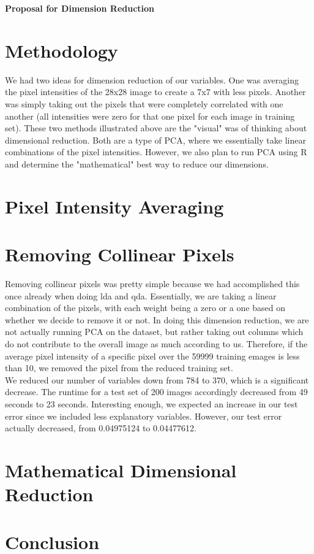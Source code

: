 \documentclass[10pt]{extarticle}
\begin{document}
\noindent
{}

\begin{center}
\LARGE{\textbf{Proposal for Dimension Reduction}}
\end{center}

\section{Methodology}
\blank

We had two ideas for dimension reduction of our variables. One was averaging the pixel intensities of the 28x28 image to create a 7x7 with less pixels. Another was simply taking out the pixels that were completely correlated with one another (all intensities were zero for that one pixel for each image in training set). These two methods illustrated above are the "visual" was of thinking about dimensional reduction. Both are a type of PCA, where we essentially take linear combinations of the pixel intensities. However, we also plan to run PCA using R and determine the "mathematical" best way to reduce our dimensions.

\section{Pixel Intensity Averaging}
\blank


\section{Removing Collinear Pixels}
\blank

Removing collinear pixels was pretty simple because we had accomplished this once already when doing lda and qda. Essentially, we are taking a linear combination of the pixels, with each weight being a zero or a one based on whether we decide to remove it or not. In doing this dimension reduction, we are not actually running PCA on the dataset, but rather taking out columns which do not contribute to the overall image as much according to us. Therefore, if the average pixel intensity of a specific pixel over the 59999 training emages is less than 10, we removed the pixel from the reduced training set.\\

We reduced our number of variables down from 784 to 370, which is a significant decrease. The runtime for a test set of 200 images accordingly decreased from 49 seconds to 23 seconds. Interesting enough, we expected an increase in our test error since we included less explanatory variables. However, our test error actually decreased, from 0.04975124 to 0.04477612.

\section{Mathematical Dimensional Reduction}
\blank


\section{Conclusion}
\blank 
\end{document}
